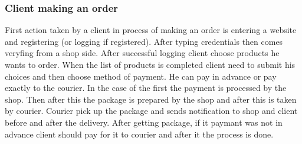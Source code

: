 \documentclass[../main.tex]{subfiles}
\begin{document}
\subsubsection{Client making an order}
\vspace{5mm}
\vspace{5mm}


First action taken by a client in process of making an order is entering a website and registering (or logging if registered). After typing credentials then comes veryfing from a shop side. After successful logging client choose products he wants to order. When the list of products is completed client need to submit his choices and then choose method of payment. He can pay in advance or pay exactly to the courier. In the case of the first the payment is processed by the shop.
Then after this the package is prepared by the shop and after this is taken by courier. Courier pick up the package and sends notification to shop and client before and after the delivery. After getting package, if it paymant was not in advance client should pay for it to courier and after it the process is done.
\end{document}
